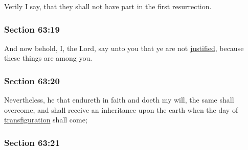 		Verily I say, that they shall not have part in the first resurrection.


	\subsubsection{Section 63:19} %
		\label{DC63-19}

		And now behold, I, the Lord, say unto you that ye are not \hyperref[JUSTIFICATION]{justified}, because these things are among you.


	\subsubsection{Section 63:20} %
		\label{DC63-20}

		Nevertheless, he that endureth in faith and doeth my will, the same shall overcome, and shall receive an inheritance upon the earth when the day of \hyperref[TRANSFIGURATION]{transfiguration} shall come;


	\subsubsection{Section 63:21} %
		\label{DC63-21}

